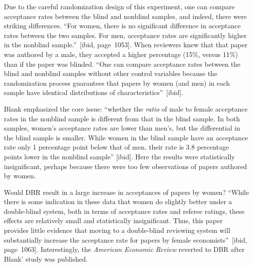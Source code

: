 \documentclass[acmtods,acmnow]{acmtrans2m}
\begin{document}
Due to the careful randomization design of this experiment, one can compare
acceptance rates between the blind and nonblind samples, and indeed, there
were striking differences. ``For women,
there is no significant difference in acceptance rates between the two
samples. For men, acceptance rates are significantly
higher in the nonblind sample.''~[ibid, page~1053]. When reviewers knew that
that paper was authored by a male, they accepted a higher percentage (15\%,
versus 11\%) than if the paper was blinded. ``One can compare
acceptance rates between the blind and nonblind samples without other
control variables because the randomization process guarantees that papers
by women (and men) in each sample have identical distributions of
characteristics''~[ibid].

Blank emphasized the core issue: ``whether the {\em ratio} of male to female
acceptance rates in the nonblind sample is different from that in the blind
sample. In both samples, women's acceptance rates are lower than men's, but
the differential in the blind sample is smaller. While women in the blind
sample have an acceptance rate only 1 percentage point below that of men,
their rate is 3.8 percentage points lower in the nonblind sample''
[ibid]. Here the results were statistically insignificant, perhaps because
there were too few observations of papers authored by women.

Would DBR result in a large increase in acceptances of papers by women?
``While there is some indication in these data that women do slightly better
under a double-blind system, both in terms of acceptance rates and referee
ratings, these effects are relatively small and statistically
insignificant. Thus, this paper provides little evidence that moving to a
double-blind reviewing system will substantially increase the acceptance
rate for papers by female economists''~[ibid, page~1063]. Interestingly, the
{\em American Economic Review} reverted to DBR after Blank' study was published.
\end{document}
